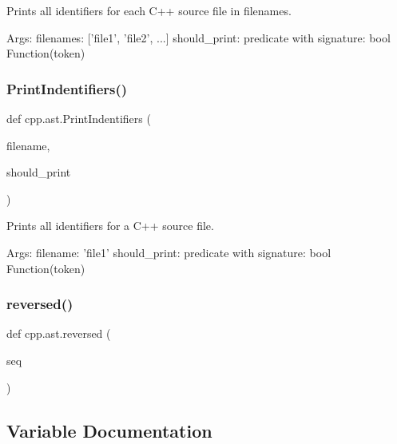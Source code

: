 \begin{DoxyVerb}Prints all identifiers for each C++ source file in filenames.

Args:
  filenames: ['file1', 'file2', ...]
  should_print: predicate with signature: bool Function(token)
\end{DoxyVerb}
 \mbox{\label{namespacecpp_1_1ast_a6a793b93aff7779af7017d001ce3b226}} 
\subsubsection{\texorpdfstring{PrintIndentifiers()}{PrintIndentifiers()}}
{\footnotesize\ttfamily def cpp.\+ast.\+Print\+Indentifiers (\begin{DoxyParamCaption}\item[{}]{filename,  }\item[{}]{should\+\_\+print }\end{DoxyParamCaption})}

\begin{DoxyVerb}Prints all identifiers for a C++ source file.

Args:
  filename: 'file1'
  should_print: predicate with signature: bool Function(token)
\end{DoxyVerb}
 \mbox{\label{namespacecpp_1_1ast_a0b1c00fd4aaa476b10de6b3a2550f39f}} 
\subsubsection{\texorpdfstring{reversed()}{reversed()}}
{\footnotesize\ttfamily def cpp.\+ast.\+reversed (\begin{DoxyParamCaption}\item[{}]{seq }\end{DoxyParamCaption})}



\subsection{Variable Documentation}
\mbox{\label{namespacecpp_1_1ast_a6462424cd2b9884f63bf7594811321cd}} 

